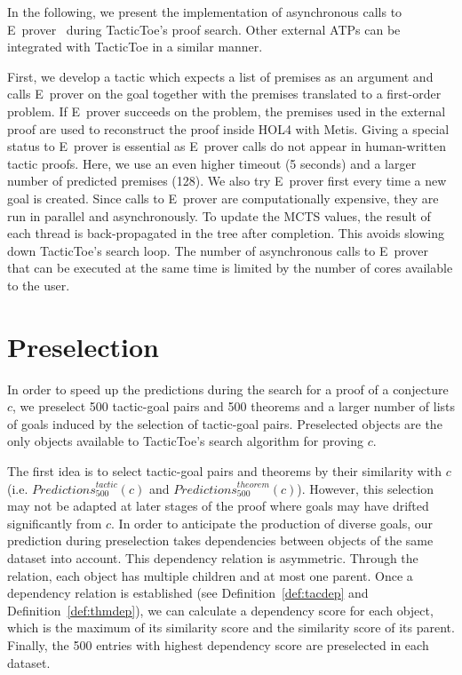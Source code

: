 \documentclass[runningheads,a4paper,draft]{svjour3}
\def\holfour{\textsf{HOL4}\xspace}
\def\eprover{\textsf{E~prover}\xspace}
\def\metis{\textsf{Metis}\xspace}
\def\tactictoe{\textsf{TacticToe}\xspace}
\begin{document}
In the following, we present the implementation of asynchronous calls to
\eprover~\cite{eprover} during \tactictoe's proof search.
Other external ATPs can be integrated with \tactictoe in a similar manner.

First, we develop a tactic which expects a list of premises as an
argument and calls \eprover on the goal together with the premises translated
to a first-order problem. If \eprover
succeeds on the problem, the premises used in the external proof are used to
reconstruct the proof inside \holfour with \metis. Giving a special status
to \eprover is essential as \eprover calls do not appear in human-written
tactic proofs. Here, we use an even higher timeout (5 seconds) and
a larger number of predicted premises (128). We also try \eprover
first every time a new goal is created. Since calls to \eprover are
computationally expensive, they are run in parallel and asynchronously. To
update the MCTS values, the
result of each thread is back-propagated in the tree after completion. This
avoids slowing down \tactictoe's search loop. The number of asynchronous calls
to \eprover that can be executed at the same time is limited by the
number of cores available to the user.

\section{Preselection}\label{sec:presel}

In order to speed up the predictions during the search for a proof of a
conjecture $c$, we preselect 500 tactic-goal pairs and 500 theorems and a
larger number of lists of goals induced by the selection of tactic-goal pairs.
Preselected objects are the only objects available to \tactictoe's search
algorithm for proving $c$.


The first idea is to select tactic-goal pairs and theorems by their similarity
with $c$ (i.e. $\mathit{Predictions}^{\mathit{tactic}}_{500} (c)$ and
$\mathit{Predictions}^{\mathit{theorem}}_{500} (c)$).
However, this selection may not be adapted at later stages of
the proof where goals may have drifted significantly from $c$. In order to
anticipate the production of diverse goals, our prediction during preselection
takes dependencies between objects of the same dataset into account.
This dependency relation is asymmetric. Through the relation, each object has
multiple children and at most one parent.
Once a dependency relation is established (see Definition~\ref{def:tacdep} and 
Definition~\ref{def:thmdep}), we can calculate a dependency score
for each object, which is the maximum of its similarity score
and the similarity score of its parent. Finally, the 500 entries with
highest dependency score are preselected in each dataset.
\end{document}
